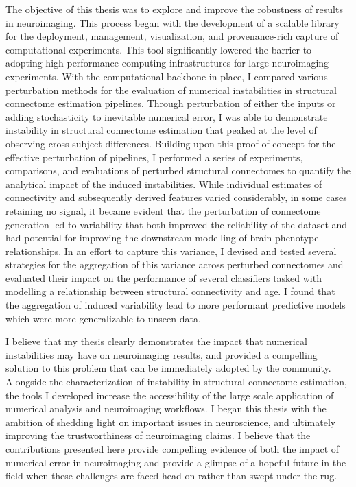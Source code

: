 The objective of this thesis was to explore and improve the robustness of results in neuroimaging. This process
began with the development of a scalable library for the deployment, management, visualization, and
provenance-rich capture of computational experiments. This tool significantly lowered the barrier to adopting high
performance computing infrastructures for large neuroimaging experiments. With the computational backbone in place,
I compared various perturbation methods for the evaluation of numerical instabilities in structural connectome
estimation pipelines. Through perturbation of either the inputs or adding stochasticity to inevitable numerical
error, I was able to demonstrate instability in structural connectome estimation that peaked at the level of
observing cross-subject differences. Building upon this proof-of-concept for the effective perturbation of pipelines,
I performed a series of experiments, comparisons, and evaluations of perturbed structural connectomes to quantify the
analytical impact of the induced instabilities. While individual estimates of connectivity and subsequently derived
features varied considerably, in some cases retaining no signal, it became evident that the perturbation of
connectome generation led to variability that both improved the reliability of the dataset and had potential for
improving the downstream modelling of brain-phenotype relationships. In an effort to capture this variance, I devised
and tested several strategies for the aggregation of this variance across perturbed connectomes and evaluated their
impact on the performance of several classifiers tasked with modelling a relationship between structural connectivity
and age. I found that the aggregation of induced variability lead to more performant predictive models which were
more generalizable to unseen data.

I believe that my thesis clearly demonstrates the impact that numerical instabilities may have on neuroimaging
results, and provided a compelling solution to this problem that can be immediately adopted by the community.
Alongside the characterization of instability in structural connectome estimation, the tools I developed increase the
accessibility of the large scale application of numerical analysis and neuroimaging workflows. I began this thesis
with the ambition of shedding light on important issues in neuroscience, and ultimately improving the trustworthiness
of neuroimaging claims. I believe that the contributions presented here provide compelling evidence of both the
impact of numerical error in neuroimaging and provide a glimpse of a hopeful future in the field when these
challenges are faced head-on rather than swept under the rug.

